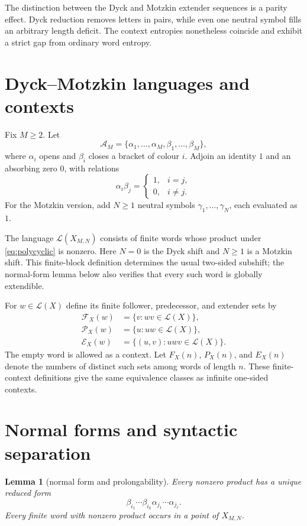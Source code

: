 \documentclass[11pt,a4paper]{amsart}
\newtheorem{lemma}[theorem]{Lemma}
\theoremstyle{definition}
\theoremstyle{remark}
\newcommand{\cL}{\mathcal L}
\newcommand{\cF}{\mathcal F}
\newcommand{\cP}{\mathcal P}
\newcommand{\cE}{\mathcal E}
\begin{document}
The distinction between the Dyck and Motzkin extender sequences is a parity
effect.  Dyck reduction removes letters in pairs, while even one neutral
symbol fills an arbitrary length deficit.  The context entropies nonetheless
coincide and exhibit a strict gap from ordinary word entropy.

\section{Dyck--Motzkin languages and contexts}

Fix $M\geq2$.  Let
\[
 \mathcal A_M=\{\alpha_1,\ldots,\alpha_M,
                    \beta_1,\ldots,\beta_M\},
\]
where $\alpha_i$ opens and $\beta_i$ closes a bracket of colour $i$.
Adjoin an identity $1$ and an absorbing zero $0$, with relations
\begin{equation}\label{eq:polycyclic}
 \alpha_i\beta_j=\begin{cases}1,&i=j,\\0,&i\neq j.\end{cases}
\end{equation}
For the Motzkin version, add $N\geq1$ neutral symbols
$\gamma_1,\ldots,\gamma_N$, each evaluated as $1$.

The language $\cL(X_{M,N})$ consists of finite words whose product under
\eqref{eq:polycyclic} is nonzero.  Here $N=0$ is the Dyck shift and $N\geq1$
is a Motzkin shift.  This finite-block definition determines the usual
two-sided subshift; the normal-form lemma below also verifies that every such
word is globally extendible.

For $w\in\cL(X)$ define its finite follower, predecessor, and extender sets by
\begin{align*}
 \cF_X(w)&=\{v:wv\in\cL(X)\},\\
 \cP_X(w)&=\{u:uw\in\cL(X)\},\\
 \cE_X(w)&=\{(u,v):uwv\in\cL(X)\}.
\end{align*}
The empty word is allowed as a context.
Let $F_X(n)$, $P_X(n)$, and $E_X(n)$ denote the numbers of distinct such sets
among words of length $n$.  These finite-context definitions give the same
equivalence classes as infinite one-sided contexts.

\section{Normal forms and syntactic separation}

\begin{lemma}[normal form and prolongability]\label{lem:normal-form}
Every nonzero product has a unique reduced form
\begin{equation}\label{eq:normal}
 \beta_{i_1}\cdots\beta_{i_k}
 \alpha_{j_1}\cdots\alpha_{j_\ell}.
\end{equation}
Every finite word with nonzero product occurs in a point of $X_{M,N}$.
\end{lemma}
\end{document}
